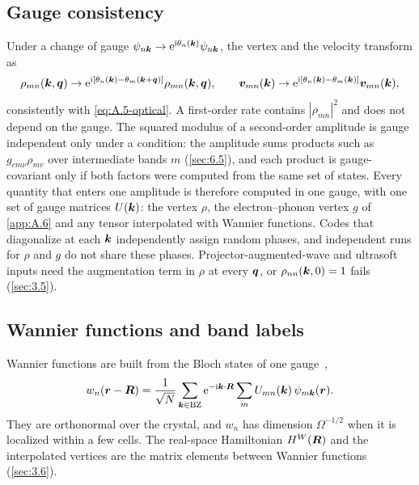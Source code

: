 \subsection{Gauge consistency}

Under a change of gauge $\psi_{n\bm{k}} \to \mathrm{e}^{\mathrm{i}\theta_n(\bm{k})}\psi_{n\bm{k}}$, the vertex and the velocity transform as
\begin{equation}
  \rho_{mn}(\bm{k},\bm{q}) \to \mathrm{e}^{\mathrm{i}[\theta_n(\bm{k}) - \theta_m(\bm{k}+\bm{q})]}\rho_{mn}(\bm{k},\bm{q}), \qquad
  \bm{v}_{mn}(\bm{k}) \to \mathrm{e}^{\mathrm{i}[\theta_n(\bm{k}) - \theta_m(\bm{k})]}\bm{v}_{mn}(\bm{k}),
  \label{eq:A.5-gauge}
\end{equation}
consistently with \cref{eq:A.5-optical}. A first-order rate contains $|\rho_{mn}|^2$ and does not depend on the gauge. The squared modulus of a second-order amplitude is gauge independent only under a condition: the amplitude sums products such as $g_{cm\nu}\rho_{mv}$ over intermediate bands $m$ (\cref{sec:6.5}), and each product is gauge-covariant only if both factors were computed from the same set of states. Every quantity that enters one amplitude is therefore computed in one gauge, with one set of gauge matrices $U(\bm{k})$: the vertex $\rho$, the electron--phonon vertex $g$ of \cref{app:A.6} and any tensor interpolated with Wannier functions. Codes that diagonalize at each $\bm{k}$ independently assign random phases, and independent runs for $\rho$ and $g$ do not share these phases. Projector-augmented-wave and ultrasoft inputs need the augmentation term in $\rho$ at every $\bm{q}$, or $\rho_{nn}(\bm{k},0) = 1$ fails (\cref{sec:3.5}).

\subsection{Wannier functions and band labels}

Wannier functions are built from the Bloch states of one gauge~\cite[Eqs.~(10) and (14)]{marzari2012maximally},
\begin{equation}
  w_n(\bm{r} - \bm{R}) = \frac{1}{\sqrt N}\sum_{\bm{k}\in\mathrm{BZ}}\mathrm{e}^{-\mathrm{i}\bm{k}\cdot\bm{R}}\sum_m U_{mn}(\bm{k})\,\psi_{m\bm{k}}(\bm{r}).
  \label{eq:A.5-wannier}
\end{equation}
They are orthonormal over the crystal, and $w_n$ has dimension $\Omega^{-1/2}$ when it is localized within a few cells. The real-space Hamiltonian $H^W(\bm{R})$ and the interpolated vertices are the matrix elements between Wannier functions (\cref{sec:3.6}).

